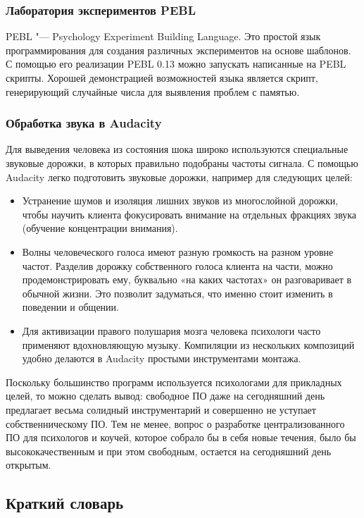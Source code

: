 \documentclass[10pt, a5paper]{article}
\begin{document}
\subsubsection*{Лаборатория экспериментов PEBL}

PEBL "--- Psychology Experiment Building Language. Это простой язык программирования для создания различных экспериментов на основе шаблонов. С помощью его реализации PEBL 0.13 можно запускать написанные на PEBL скрипты. Хорошей демонстрацией возможностей языка является скрипт, генерирующий случайные числа для выявления проблем с памятью.

\subsubsection*{Обработка звука в Audacity}

Для выведения человека из состояния шока широко используются специальные звуковые дорожки, в которых правильно подобраны частоты сигнала. С помощью Audacity легко подготовить звуковые дорожки, например для следующих целей:
\begin{itemize}
 \item	Устранение шумов и изоляция лишних звуков из многослойной дорожки, чтобы научить клиента фокусировать внимание на отдельных фракциях звука (обучение концентрации внимания).
 \item	Волны человеческого голоса имеют разную громкость на разном уровне частот. Разделив дорожку собственного голоса клиента на части, можно продемонстрировать ему, буквально «на каких частотах» он разговаривает в обычной жизни. Это позволит задуматься, что именно стоит изменить в поведении и общении.
 \item	Для активизации правого полушария мозга человека психологи часто применяют вдохновляющую музыку. Компиляции из нескольких композиций удобно делаются в Audacity простыми инструментами монтажа.
\end{itemize}

Поскольку большинство программ используется психологами \linebreak для прикладных целей, то можно сделать вывод: свободное ПО даже на сегодняшний день предлагает весьма солидный инструментарий и совершенно не уступает собственническому ПО.
	Тем не менее, вопрос о разработке централизованного ПО для психологов и коучей, которое собрало бы в себя новые течения, было бы высококачественным и при этом свободным, остается на сегодняшний день открытым.

\subsection*{Краткий словарь}
\end{document}
